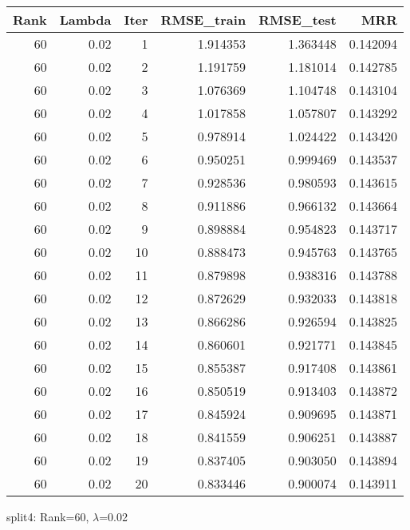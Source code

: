 \begin{tabular}{rrrrrr}
\toprule
 Rank &  Lambda &  Iter &  RMSE\_train &  RMSE\_test &       MRR \\
\midrule
   60 &    0.02 &     1 &    1.914353 &   1.363448 &  0.142094 \\
   60 &    0.02 &     2 &    1.191759 &   1.181014 &  0.142785 \\
   60 &    0.02 &     3 &    1.076369 &   1.104748 &  0.143104 \\
   60 &    0.02 &     4 &    1.017858 &   1.057807 &  0.143292 \\
   60 &    0.02 &     5 &    0.978914 &   1.024422 &  0.143420 \\
   60 &    0.02 &     6 &    0.950251 &   0.999469 &  0.143537 \\
   60 &    0.02 &     7 &    0.928536 &   0.980593 &  0.143615 \\
   60 &    0.02 &     8 &    0.911886 &   0.966132 &  0.143664 \\
   60 &    0.02 &     9 &    0.898884 &   0.954823 &  0.143717 \\
   60 &    0.02 &    10 &    0.888473 &   0.945763 &  0.143765 \\
   60 &    0.02 &    11 &    0.879898 &   0.938316 &  0.143788 \\
   60 &    0.02 &    12 &    0.872629 &   0.932033 &  0.143818 \\
   60 &    0.02 &    13 &    0.866286 &   0.926594 &  0.143825 \\
   60 &    0.02 &    14 &    0.860601 &   0.921771 &  0.143845 \\
   60 &    0.02 &    15 &    0.855387 &   0.917408 &  0.143861 \\
   60 &    0.02 &    16 &    0.850519 &   0.913403 &  0.143872 \\
   60 &    0.02 &    17 &    0.845924 &   0.909695 &  0.143871 \\
   60 &    0.02 &    18 &    0.841559 &   0.906251 &  0.143887 \\
   60 &    0.02 &    19 &    0.837405 &   0.903050 &  0.143894 \\
   60 &    0.02 &    20 &    0.833446 &   0.900074 &  0.143911 \\
\bottomrule
\end{tabular}

\caption{split4: Rank=60, $\lambda$=0.02}
